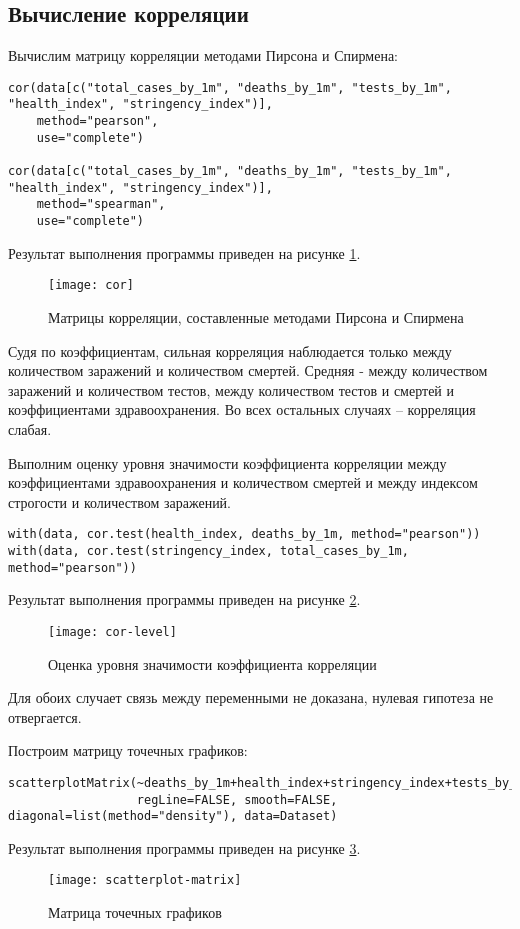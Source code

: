 \documentclass[a4paper,14pt]{extarticle}
\begin{document}
\subsection{Вычисление корреляции}
Вычислим матрицу корреляции методами Пирсона и Спирмена:
\begin{lstlisting}
cor(data[c("total_cases_by_1m", "deaths_by_1m", "tests_by_1m", "health_index", "stringency_index")],
    method="pearson",
    use="complete")

cor(data[c("total_cases_by_1m", "deaths_by_1m", "tests_by_1m", "health_index", "stringency_index")],
    method="spearman",
    use="complete")
\end{lstlisting}
Результат выполнения программы приведен на рисунке \ref{fig:cor}.
\begin{figure}[H]
    \centering
    \texttt{[image: cor]}
    \caption{Матрицы корреляции, составленные методами Пирсона и Спирмена}
    \label{fig:cor}
\end{figure}

Судя по коэффициентам, сильная корреляция наблюдается только между количеством
заражений и количеством смертей. Средняя - между количеством заражений и
количеством тестов, между количеством тестов и смертей и коэффициентами
здравоохранения. Во всех остальных случаях -- корреляция слабая.

Выполним оценку уровня значимости коэффициента корреляции между коэффициентами
здравоохранения и количеством смертей и между индексом строгости и количеством
заражений.
\begin{lstlisting}
with(data, cor.test(health_index, deaths_by_1m, method="pearson"))
with(data, cor.test(stringency_index, total_cases_by_1m, method="pearson"))
\end{lstlisting}
Результат выполнения программы приведен на рисунке \ref{fig:cor-level}.
\begin{figure}[H]
    \centering
    \texttt{[image: cor-level]}
    \caption{Оценка уровня значимости коэффициента корреляции}
    \label{fig:cor-level}
\end{figure}

Для обоих случает связь между переменными не доказана, нулевая гипотеза не
отвергается.

Построим матрицу точечных графиков:
\begin{lstlisting}
scatterplotMatrix(~deaths_by_1m+health_index+stringency_index+tests_by_1m+total_cases_by_1m,
                  regLine=FALSE, smooth=FALSE, diagonal=list(method="density"), data=Dataset)
\end{lstlisting}
Результат выполнения программы приведен на рисунке \ref{fig:scatterplot-matrix}.
\begin{figure}[H]
    \centering
    \texttt{[image: scatterplot-matrix]}
    \caption{Матрица точечных графиков}
    \label{fig:scatterplot-matrix}
\end{figure}
\pagebreak
\end{document}
